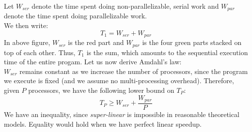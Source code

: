 \documentclass[main.tex]{subfiles}
\begin{document}
Let $W_{ser}$ denote the time spent doing non-parallelizable, serial work and $W_{par}$ denote the time spent doing parallelizable work.\\
We then write:
\begin{equation*}
    T_1 = W_{ser} + W_{par}
\end{equation*}
In above figure, $W_{ser}$ is the red part and $W_{par}$ is the four green parts stacked on top of each other. Thus, $T_{1}$ is the sum, which amounts to the sequential execution time of the entire progam. Let us now derive Amdahl's law:\\[3mm]
$W_{ser}$ remains constant as we increase the number of processors, since the program we execute is fixed (and we assume no multi-processing overhead). Therefore, given $P$ processors, we have the following lower bound on $T_P$:
\begin{equation*}
    T_P \geq W_{ser} + \frac{W_{par}}{P}
\end{equation*}
We have an inequality, since \textit{super-linear} is impossible in reasonable theoretical models. Equality would hold when we have perfect linear speedup.
\end{document}
